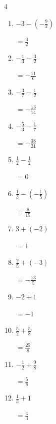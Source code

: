 \begin{multicols}{4}
\begin{enumerate}
        $\displaystyle =6$

  \item $\displaystyle -3 - \left(-\frac{9}{2}\right)$

        $\displaystyle =\frac{3}{2}$

  \item $\displaystyle -\frac{1}{3} - \frac{3}{2}$

        $\displaystyle =-\frac{11}{6}$

\columnbreak %

  \item $\displaystyle -\frac{3}{7} - \frac{1}{2}$

        $\displaystyle =-\frac{13}{14}$

  \item $\displaystyle -\frac{5}{3} - \frac{1}{7}$

        $\displaystyle =-\frac{38}{21}$

  \item $\displaystyle \frac{1}{2} - \frac{1}{2}$

        $\displaystyle =0$

  \item $\displaystyle \frac{1}{3} - \left(-\frac{1}{5}\right)$

        $\displaystyle =\frac{8}{15}$

  \item $\displaystyle 3 + \left(-2\right)$

        $\displaystyle =1$

  \item $\displaystyle \frac{2}{5} + \left(-3\right)$

        $\displaystyle =-\frac{13}{5}$

  \item $\displaystyle -2 + 1$

        $\displaystyle =-1$

  \item $\displaystyle \frac{5}{2} + \frac{5}{8}$

        $\displaystyle =\frac{25}{8}$

  \item $\displaystyle -\frac{1}{2} + \frac{9}{8}$

        $\displaystyle =\frac{5}{8}$

  \item $\displaystyle \frac{1}{3} + 1$

        $\displaystyle =\frac{4}{3}$


\end{enumerate}
\end{multicols}
